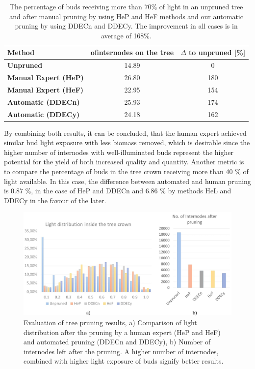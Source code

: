 \begin{table}
\begin{center}
\begin{tabular}{ |l|c|c| } 
 \hline
 \textbf{Method} &  ofinternodes on the tree  & $\Delta$ to unpruned [\%] \\ 
  \hline
 \textbf{Unpruned}            & 14.89 & 0 \\ 
 \hline
 \textbf{Manual Expert (HeP)} & 26.80 & 180 \\ 
 \textbf{Manual Expert (HeF)} & 22.95 & 154 \\ 
  \hline
 \textbf{Automatic (DDECn)} & 25.93 & 174 \\ 
 \textbf{Automatic (DDECy)} & 24.18 & 162 \\ 
 \hline
\end{tabular}
\end{center}
\caption{The percentage of buds receiving more than 70\% of light in an unpruned tree and after manual pruning by using HeP and HeF methods and our automatic pruning by using DDECn and DDECy. The improvement in all cases is in average of 168\%. }
\label{tab:inodes}
\end{table}


By combining both results, it can be concluded, that the human expert
achieved similar bud light exposure with less biomass removed,
which is desirable since the higher number of internodes with
well-illuminated buds represent the higher potential for the yield of
both increased quality and quantity. Another metric is to compare the
percentage of buds in the tree crown receiving more than 40 \% of light
available. In this case, the difference between automated and human
pruning is 0.87 \%, in the case of HeP and DDECn and 6.86 \% by methods HeL and DDECy in the favour of the later.

\begin{figure}[hbt]
    \centering
    \includegraphics[width=5in]{figs/image5.jpeg}
    \caption{Evaluation of tree pruning results, a) Comparison of
light distribution after the pruning by a human expert (HeP and HeF) and
automated pruning (DDECn and DDECy), b) Number of internodes left after
the pruning. A higher number of internodes, combined with higher light
exposure of buds signify better results.}
\label{fig:my_figure5}
\end{figure}

